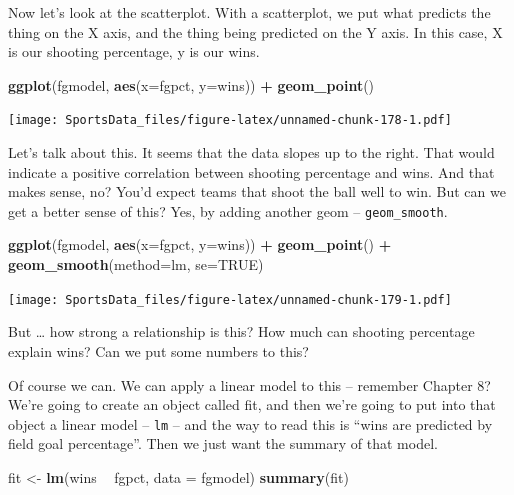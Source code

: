 \documentclass[]{book}
\newenvironment{Shaded}{\begin{snugshade}}{\end{snugshade}}
\newcommand{\KeywordTok}[1]{\textcolor[rgb]{0.13,0.29,0.53}{\textbf{#1}}}
\newcommand{\DataTypeTok}[1]{\textcolor[rgb]{0.13,0.29,0.53}{#1}}
\newcommand{\StringTok}[1]{\textcolor[rgb]{0.31,0.60,0.02}{#1}}
\newcommand{\OtherTok}[1]{\textcolor[rgb]{0.56,0.35,0.01}{#1}}
\newcommand{\OperatorTok}[1]{\textcolor[rgb]{0.81,0.36,0.00}{\textbf{#1}}}
\newcommand{\NormalTok}[1]{#1}
\begin{document}
Now let's look at the scatterplot. With a scatterplot, we put what
predicts the thing on the X axis, and the thing being predicted on the Y
axis. In this case, X is our shooting percentage, y is our wins.

\begin{Shaded}
\begin{Highlighting}[]
\KeywordTok{ggplot}\NormalTok{(fgmodel, }\KeywordTok{aes}\NormalTok{(}\DataTypeTok{x=}\NormalTok{fgpct, }\DataTypeTok{y=}\NormalTok{wins)) }\OperatorTok{+}\StringTok{ }\KeywordTok{geom_point}\NormalTok{()}
\end{Highlighting}
\end{Shaded}

\texttt{[image: SportsData\_files/figure-latex/unnamed-chunk-178-1.pdf]}

Let's talk about this. It seems that the data slopes up to the right.
That would indicate a positive correlation between shooting percentage
and wins. And that makes sense, no? You'd expect teams that shoot the
ball well to win. But can we get a better sense of this? Yes, by adding
another geom -- \texttt{geom\_smooth}.

\begin{Shaded}
\begin{Highlighting}[]
\KeywordTok{ggplot}\NormalTok{(fgmodel, }\KeywordTok{aes}\NormalTok{(}\DataTypeTok{x=}\NormalTok{fgpct, }\DataTypeTok{y=}\NormalTok{wins)) }\OperatorTok{+}\StringTok{ }\KeywordTok{geom_point}\NormalTok{() }\OperatorTok{+}\StringTok{ }\KeywordTok{geom_smooth}\NormalTok{(}\DataTypeTok{method=}\NormalTok{lm, }\DataTypeTok{se=}\OtherTok{TRUE}\NormalTok{)}
\end{Highlighting}
\end{Shaded}

\texttt{[image: SportsData\_files/figure-latex/unnamed-chunk-179-1.pdf]}

But \ldots{} how strong a relationship is this? How much can shooting
percentage explain wins? Can we put some numbers to this?

Of course we can. We can apply a linear model to this -- remember
Chapter 8? We're going to create an object called fit, and then we're
going to put into that object a linear model -- \texttt{lm} -- and the
way to read this is ``wins are predicted by field goal percentage''.
Then we just want the summary of that model.

\begin{Shaded}
\begin{Highlighting}[]
\NormalTok{fit <-}\StringTok{ }\KeywordTok{lm}\NormalTok{(wins }\OperatorTok{~}\StringTok{ }\NormalTok{fgpct, }\DataTypeTok{data =}\NormalTok{ fgmodel)}
\KeywordTok{summary}\NormalTok{(fit)}
\end{Highlighting}
\end{Shaded}
\end{document}
